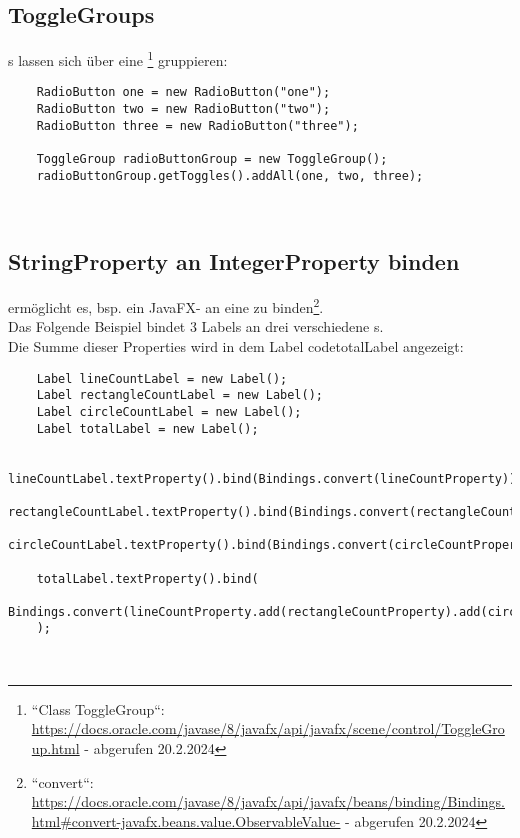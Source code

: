 \subsection*{ToggleGroups}
s lassen sich über eine \footnote{
``Class ToggleGroup``: \url{https://docs.oracle.com/javase/8/javafx/api/javafx/scene/control/ToggleGroup.html} - abgerufen 20.2.2024
} gruppieren:

\begin{verbatim}
    RadioButton one = new RadioButton("one");
    RadioButton two = new RadioButton("two");
    RadioButton three = new RadioButton("three");

    ToggleGroup radioButtonGroup = new ToggleGroup();
    radioButtonGroup.getToggles().addAll(one, two, three);
\end{verbatim}\\

\subsection*{StringProperty an IntegerProperty binden}

\begin{center}\end{center}
ermöglicht es, bsp. ein JavaFX- an eine  zu binden\footnote{
``convert``: \url{https://docs.oracle.com/javase/8/javafx/api/javafx/beans/binding/Bindings.html#convert-javafx.beans.value.ObservableValue-} - abgerufen 20.2.2024
}.\\

\noindent
Das Folgende Beispiel bindet 3 Labels an drei verschiedene s.\\
Die Summe dieser Properties wird in dem Label code{totalLabel} angezeigt:
\begin{verbatim}
    Label lineCountLabel = new Label();
    Label rectangleCountLabel = new Label();
    Label circleCountLabel = new Label();
    Label totalLabel = new Label();

    lineCountLabel.textProperty().bind(Bindings.convert(lineCountProperty));
    rectangleCountLabel.textProperty().bind(Bindings.convert(rectangleCountProperty));
    circleCountLabel.textProperty().bind(Bindings.convert(circleCountProperty));

    totalLabel.textProperty().bind(
        Bindings.convert(lineCountProperty.add(rectangleCountProperty).add(circleCountProperty))
    );
\end{verbatim}\\


